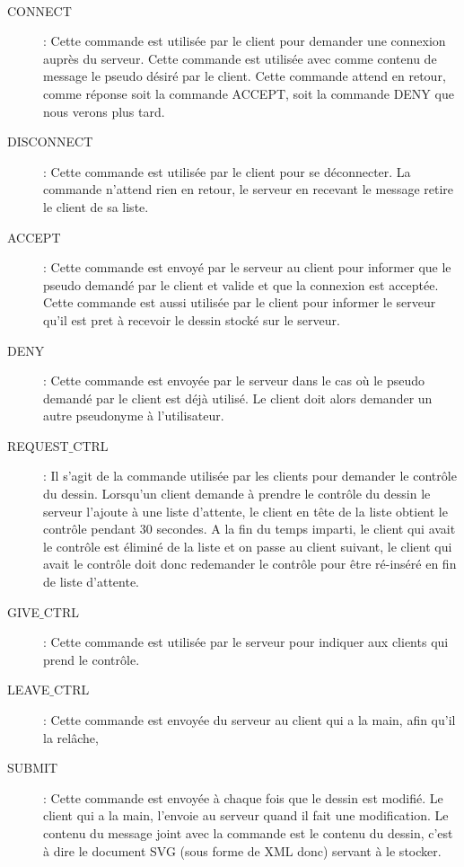 \documentclass[a4paper,11pt]{article}
\begin{document}
\paragraph{}
\begin{description}
\item[CONNECT] : Cette commande est utilisée par le client pour demander une connexion auprès du serveur. Cette commande est utilisée avec comme contenu de message le pseudo désiré par le client. Cette commande attend en retour, comme réponse soit la commande ACCEPT, soit la commande DENY que nous verons plus tard.

\item [DISCONNECT] : Cette commande est utilisée par le client pour se déconnecter. La commande n'attend rien en retour, le serveur en recevant le message retire le client de sa liste.

\item [ACCEPT] : Cette commande est envoyé par le serveur au client pour informer que le pseudo demandé par le client et valide et que la connexion est acceptée. Cette commande est aussi utilisée par le client pour informer le serveur qu'il est pret à recevoir le dessin stocké sur le serveur.

\item [DENY] : Cette commande est envoyée par le serveur dans le cas où le pseudo demandé par le client est déjà utilisé. Le client doit alors demander un autre pseudonyme à l'utilisateur.

\item  [REQUEST$\_$CTRL] : Il s'agit de la commande utilisée par les clients pour demander le contrôle du dessin. Lorsqu'un client demande à prendre le contrôle du dessin le serveur l'ajoute à une liste d'attente, le client en tête de la liste obtient le contrôle pendant 30 secondes. A la fin du temps imparti, le client qui avait le contrôle est éliminé de la liste et on passe au client suivant, le client qui avait le contrôle doit donc redemander le contrôle pour être ré-inséré en fin de liste d'attente.

\item [GIVE$\_$CTRL] : Cette commande est utilisée par le serveur pour indiquer aux clients qui prend le contrôle. 

\item [LEAVE$\_$CTRL] : Cette commande est envoyée du serveur au client qui a la main, afin qu'il la relâche,

\item [SUBMIT] : Cette commande est envoyée à chaque fois que le dessin est modifié. Le client qui a la main, l'envoie au serveur quand il fait une modification. Le contenu du message joint avec la commande est le contenu du dessin, c'est à dire le document SVG (sous forme de XML donc) servant à le stocker.


\end{description}
\end{document}
